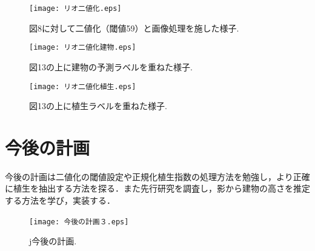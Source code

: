 \documentclass[a4j,twoside,twocolumn]{jarticle}
\begin{document}
\begin{figure}[t]
  \begin{center}
    \texttt{[image: リオ二値化.eps]}
    \caption{図8に対して二値化（閾値59）と画像処理を施した様子.}
    \label{fig13}
  \end{center}
\end{figure}

\begin{figure}[t]
  \begin{center}
    \texttt{[image: リオ二値化建物.eps]}
    \caption{図13の上に建物の予測ラベルを重ねた様子.}
    \label{fig14}
  \end{center}
\end{figure}

\begin{figure}[t]
  \begin{center}
    \texttt{[image: リオ二値化植生.eps]}
    \caption{図13の上に植生ラベルを重ねた様子.}
    \label{fig15}
  \end{center}
\end{figure}

\section{今後の計画}
今後の計画は二値化の閾値設定や正規化植生指数の処理方法を勉強し，より正確に植生を抽出する方法を探る．また先行研究を調査し，影から建物の高さを推定する方法を学び，実装する．

\begin{figure}[t]
  \begin{center}
    \texttt{[image: 今後の計画３.eps]}
　　\caption{j今後の計画.}
    \label{fig16}
  \end{center}
\end{figure}
\end{document}
